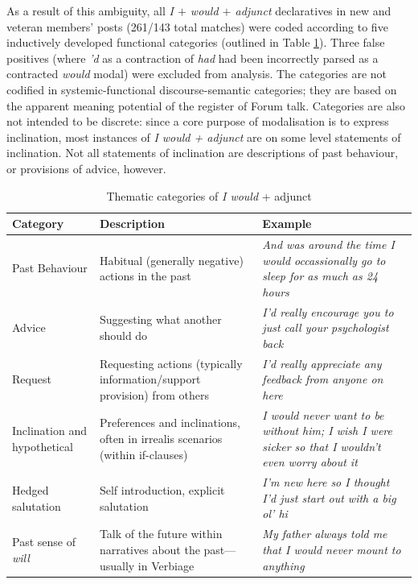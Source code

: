 As a result of this ambiguity, all \emph{I $+$ would $+$ adjunct} declaratives in new and veteran \glspl{member}' \glspl{post} (261\slash 143 total matches) were coded according to five inductively developed functional categories (outlined in Table \ref{tab:themcodes}). Three false positives (where \emph{'d} as a contraction of \emph{had} had been incorrectly parsed as a contracted \emph{would} modal) were excluded from analysis. The categories are not codified in systemic\hyp{}functional \gls{discourse-semantic} categories; they are based on the apparent meaning potential of the register of \gls{Forum} talk. Categories are also not intended to be discrete: since a core purpose of modalisation is to express inclination, most instances of \emph{I would + adjunct} are on some level statements of inclination. Not all statements of inclination are descriptions of past behaviour, or provisions of advice, however.


   
\begin{table}[htb]
    \centering
    \footnotesize
    \begin{tabularx}{\textwidth}{p{2cm}XX}
    
    \toprule
    Category    & Description & Example       \\ \midrule
    Past Behaviour       & Habitual (generally negative) actions in the past   & \emph{And was around the time I would occassionally go to sleep for as much as 24 hours}     \\ 
    Advice       & Suggesting what another should do & \emph{I'd really encourage you to just call your psychologist back}    \\ 
    Request     & Requesting actions (typically information\slash support provision) from others      & \emph{I'd really appreciate any feedback from anyone on here}          \\
    Inclination and hypothetical & Preferences and inclinations, often in irrealis scenarios (within if-clauses) & \emph{I would never want to be without him; I wish I were sicker so that I wouldn't even worry about it} \\ 
    Hedged salutation            & Self introduction, explicit salutation      & \emph{I'm new here so I thought I'd just start out with a big ol' hi} \\ 
    Past sense of \emph{will}           & Talk of the future within narratives about the past---usually in Verbiage     & \emph{My father always told me that I would never mount to anything}   \\ \bottomrule
    \end{tabularx}
    \caption{Thematic categories of \emph{I would} + adjunct}
    \label{tab:themcodes}
    \end{table}
                    

